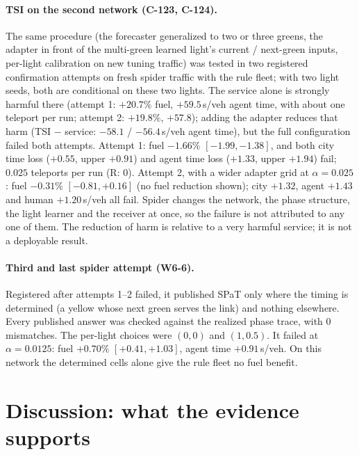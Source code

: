 \documentclass[11pt]{article}
\begin{document}
\paragraph{TSI on the second network (C-123, C-124).} The same procedure (the forecaster generalized to two or three greens, the adapter
in front of the multi-green learned light's current / next-green inputs, per-light calibration on new tuning traffic) was tested in two registered
confirmation attempts on fresh spider traffic with the rule fleet; with two light seeds, both are conditional on these two lights. The service alone is strongly harmful there (attempt 1: $+20.7\%$ fuel, $+59.5$\,s/veh agent time, with about one
teleport per run; attempt 2: $+19.8\%$, $+57.8$); adding the adapter reduces that harm (TSI $-$ service: $-58.1$ / $-56.4$\,s/veh agent time), but the full configuration failed both attempts. Attempt 1: fuel $-1.66\%$
$[-1.99,-1.38]$, and both city time loss ($+0.55$, upper $+0.91$) and agent time loss ($+1.33$, upper $+1.94$) fail; $0.025$ teleports per
run (R: 0). Attempt 2, with a wider adapter grid at $\alpha=0.025$: fuel $-0.31\%$ $[-0.81,+0.16]$ (no fuel reduction shown); city $+1.32$,
agent $+1.43$ and human $+1.20$\,s/veh all fail. Spider changes the network, the phase structure, the light learner and the receiver at
once, so the failure is not attributed to any one of them. The reduction of harm is relative to a very harmful service; it is not a
deployable result.
\paragraph{Third and last spider attempt (W6-6).} Registered after attempts 1--2 failed, it published SPaT only where the timing is
determined (a yellow whose next green serves the link) and nothing elsewhere. Every published answer was checked against the realized
phase trace, with 0 mismatches. The per-light choices were $(0,0)$ and $(1,0.5)$. It failed at $\alpha=0.0125$: fuel $+0.70\%$
$[+0.41,+1.03]$, agent time $+0.91$\,s/veh. On this network the determined cells alone give the rule fleet no fuel benefit.

\section{Discussion: what the evidence supports}\label{sec:discussion}
\end{document}
